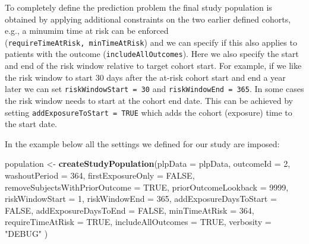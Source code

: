 \documentclass[11pt]{book}
\newenvironment{Shaded}{\begin{snugshade}}{\end{snugshade}}
\newcommand{\DataTypeTok}[1]{\textcolor[rgb]{0.13,0.29,0.53}{#1}}
\newcommand{\DecValTok}[1]{\textcolor[rgb]{0.00,0.00,0.81}{#1}}
\newcommand{\KeywordTok}[1]{\textcolor[rgb]{0.13,0.29,0.53}{\textbf{#1}}}
\newcommand{\NormalTok}[1]{#1}
\newcommand{\OtherTok}[1]{\textcolor[rgb]{0.56,0.35,0.01}{#1}}
\newcommand{\StringTok}[1]{\textcolor[rgb]{0.31,0.60,0.02}{#1}}
\theoremstyle{definition}
\theoremstyle{definition}
\theoremstyle{definition}
\theoremstyle{remark}
\begin{document}
To completely define the prediction problem the final study population is obtained by applying additional constraints on the two earlier defined cohorts, e.g., a minumim time at risk can be enforced (\texttt{requireTimeAtRisk,\ minTimeAtRisk}) and we can specify if this also applies to patients with the outcome (\texttt{includeAllOutcomes}). Here we also specify the start and end of the risk window relative to target cohort start. For example, if we like the risk window to start 30 days after the at-risk cohort start and end a year later we can set \texttt{riskWindowStart\ =\ 30} and \texttt{riskWindowEnd\ =\ 365}. In some cases the risk window needs to start at the cohort end date. This can be achieved by setting \texttt{addExposureToStart\ =\ TRUE} which adds the cohort (exposure) time to the start date.

In the example below all the settings we defined for our study are imposed:

\begin{Shaded}
\begin{Highlighting}[]
\NormalTok{population <-}\StringTok{ }\KeywordTok{createStudyPopulation}\NormalTok{(}\DataTypeTok{plpData =}\NormalTok{ plpData,}
                                    \DataTypeTok{outcomeId =} \DecValTok{2}\NormalTok{,}
                                    \DataTypeTok{washoutPeriod =} \DecValTok{364}\NormalTok{,}
                                    \DataTypeTok{firstExposureOnly =} \OtherTok{FALSE}\NormalTok{,}
                                    \DataTypeTok{removeSubjectsWithPriorOutcome =} \OtherTok{TRUE}\NormalTok{,}
                                    \DataTypeTok{priorOutcomeLookback =} \DecValTok{9999}\NormalTok{,}
                                    \DataTypeTok{riskWindowStart =} \DecValTok{1}\NormalTok{,}
                                    \DataTypeTok{riskWindowEnd =} \DecValTok{365}\NormalTok{,}
                                    \DataTypeTok{addExposureDaysToStart =} \OtherTok{FALSE}\NormalTok{,}
                                    \DataTypeTok{addExposureDaysToEnd =} \OtherTok{FALSE}\NormalTok{,}
                                    \DataTypeTok{minTimeAtRisk =} \DecValTok{364}\NormalTok{,}
                                    \DataTypeTok{requireTimeAtRisk =} \OtherTok{TRUE}\NormalTok{,}
                                    \DataTypeTok{includeAllOutcomes =} \OtherTok{TRUE}\NormalTok{,}
                                    \DataTypeTok{verbosity =} \StringTok{"DEBUG"}
\NormalTok{)}
\end{Highlighting}
\end{Shaded}
\end{document}
